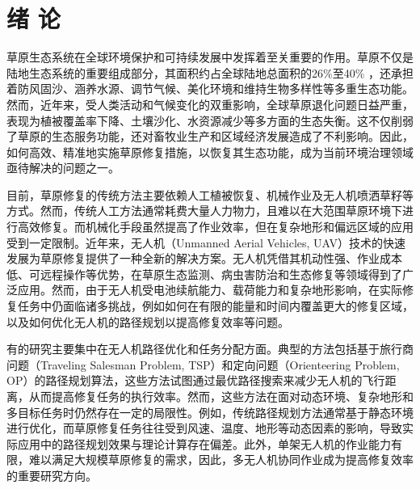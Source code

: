 \documentclass[AutoFakeBold]{LZUThesis}
\begin{document}

\chapter{\texorpdfstring{绪 \quad 论}{绪论}}




草原生态系统在全球环境保护和可持续发展中发挥着至关重要的作用。草原不仅是陆地生态系统的重要组成部分，其面积约占全球陆地总面积的26\%至40\% \cite{chapin2013global}，还承担着防风固沙、涵养水源、调节气候、美化环境和维持生物多样性等多重生态功能\cite{gibson2009grasses}。然而，近年来，受人类活动和气候变化的双重影响，全球草原退化问题日益严重，表现为植被覆盖率下降、土壤沙化、水资源减少等多方面的生态失衡。这不仅削弱了草原的生态服务功能，还对畜牧业生产和区域经济发展造成了不利影响。因此，如何高效、精准地实施草原修复措施，以恢复其生态功能，成为当前环境治理领域亟待解决的问题之一。

目前，草原修复的传统方法主要依赖人工植被恢复、机械作业及无人机喷洒草籽等方式。然而，传统人工方法通常耗费大量人力物力，且难以在大范围草原环境下进行高效修复。而机械化手段虽然提高了作业效率，但在复杂地形和偏远区域的应用受到一定限制。近年来，无人机（Unmanned Aerial Vehicles, UAV）技术的快速发展为草原修复提供了一种全新的解决方案。无人机凭借其机动性强、作业成本低、可远程操作等优势，在草原生态监测、病虫害防治和生态修复等领域得到了广泛应用。然而，由于无人机受电池续航能力、载荷能力和复杂地形影响，在实际修复任务中仍面临诸多挑战，例如如何在有限的能量和时间内覆盖更大的修复区域，以及如何优化无人机的路径规划以提高修复效率等问题。

有的研究主要集中在无人机路径优化和任务分配方面。典型的方法包括基于旅行商问题（Traveling Salesman Problem, TSP）和定向问题（Orienteering Problem, OP）的路径规划算法，这些方法试图通过最优路径搜索来减少无人机的飞行距离，从而提高修复任务的执行效率。然而，这些方法在面对动态环境、复杂地形和多目标任务时仍然存在一定的局限性。例如，传统路径规划方法通常基于静态环境进行优化，而草原修复任务往往受到风速、温度、地形等动态因素的影响，导致实际应用中的路径规划效果与理论计算存在偏差。此外，单架无人机的作业能力有限，难以满足大规模草原修复的需求，因此，多无人机协同作业成为提高修复效率的重要研究方向。
\end{document}
